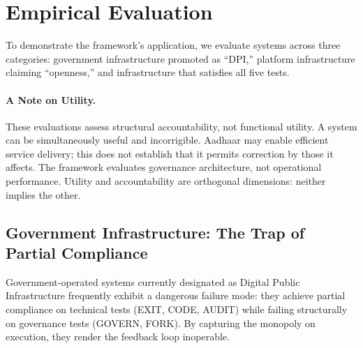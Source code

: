 \section{Empirical Evaluation}
\label{sec:diagnosis}

To demonstrate the framework's application, we evaluate systems across three categories: government infrastructure promoted as ``DPI,'' platform infrastructure claiming ``openness,'' and infrastructure that satisfies all five tests.

\paragraph{A Note on Utility.} These evaluations assess structural accountability, not functional utility. A system can be simultaneously useful and incorrigible. Aadhaar may enable efficient service delivery; this does not establish that it permits correction by those it affects. The framework evaluates governance architecture, not operational performance. Utility and accountability are orthogonal dimensions: neither implies the other.

\subsection{Government Infrastructure: The Trap of Partial Compliance}

Government-operated systems currently designated as Digital Public Infrastructure frequently exhibit a dangerous failure mode: they achieve partial compliance on technical tests (EXIT, CODE, AUDIT) while failing structurally on governance tests (GOVERN, FORK). By capturing the monopoly on execution, they render the feedback loop inoperable.

